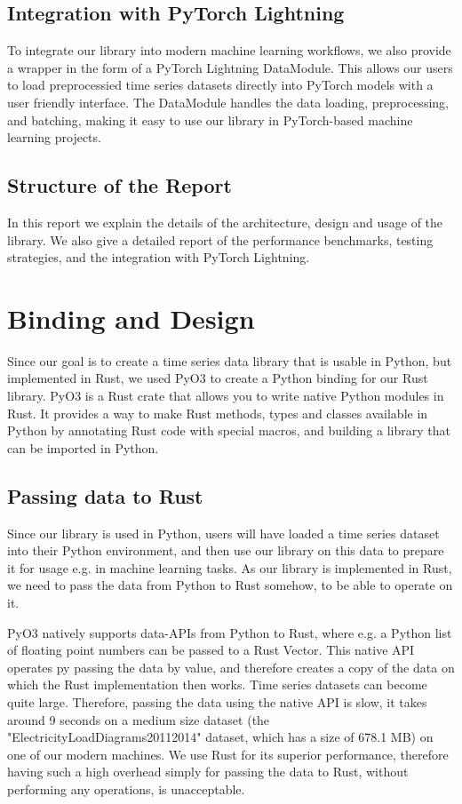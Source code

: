 \documentclass[review]{AIM_report}
\begin{document}
\subsection{Integration with PyTorch Lightning}
To integrate our library into modern machine learning workflows, we also provide a wrapper in the form of a PyTorch Lightning DataModule. This allows our users to load preprocessied time series datasets directly into PyTorch models with a user friendly interface. The DataModule handles the data loading, preprocessing, and batching, making it easy to use our library in PyTorch-based machine learning projects.

\subsection{Structure of the Report}
In this report we explain the details of the architecture, design and usage of the library. We also give a detailed report of the performance benchmarks, testing strategies, and the integration with PyTorch Lightning.

\newpage

\section{Binding and Design}

Since our goal is to create a time series data library that is usable in Python, but implemented in Rust, we used PyO3 to create a Python binding for our Rust library. PyO3 is a Rust crate that allows you to write native Python modules in Rust. It provides a way to make Rust methods, types and classes available in Python by annotating Rust code with special macros, and building a library that can be imported in Python.

\subsection{Passing data to Rust}

Since our library is used in Python, users will have loaded a time series dataset into their Python environment, and then use our library on this data to prepare it for usage e.g. in machine learning tasks. As our library is implemented in Rust, we need to pass the data from Python to Rust somehow, to be able to operate on it.

PyO3 natively supports data-APIs from Python to Rust, where e.g. a Python list of floating point numbers can be passed to a Rust Vector. This native API operates py passing the data by value, and therefore creates a copy of the data on which the Rust implementation then works. Time series datasets can become quite large. Therefore, passing the data using the native API is slow, it takes around 9 seconds on a medium size dataset (the "ElectricityLoadDiagrams20112014" dataset, which has a size of 678.1 MB) on one of our modern machines. We use Rust for its superior performance, therefore having such a high overhead simply for passing the data to Rust, without performing any operations, is unacceptable.
\end{document}
